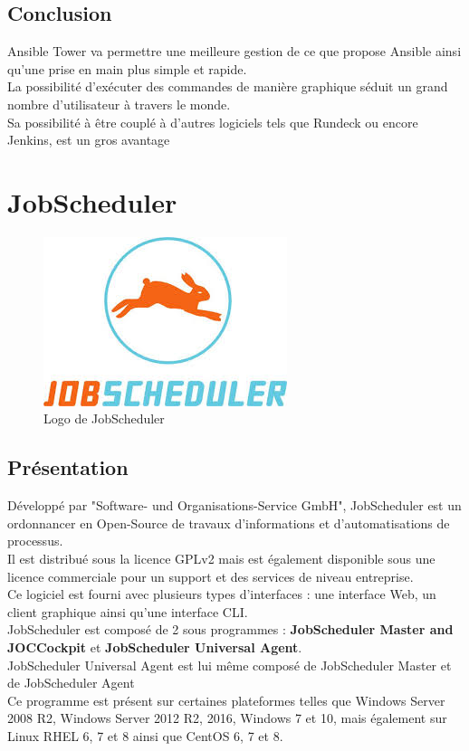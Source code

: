 \documentclass[12pt]{article}
\begin{document}
\subsection{Conclusion}
Ansible Tower va permettre une meilleure gestion de ce que propose Ansible ainsi qu'une prise en main plus simple et rapide.
\\
La possibilité d'exécuter des commandes de manière graphique séduit un grand nombre d'utilisateur à travers le monde.
\\
Sa possibilité à être couplé à d'autres logiciels tels que Rundeck ou encore Jenkins, est un gros avantage

\section{JobScheduler}

\begin{figure}[ht]
    \centering
    \includegraphics[scale=0.6]{images/jobscheduler.jpg}
    \caption{Logo de JobScheduler}
\end{figure}

\subsection{Présentation}
Développé par "Software- und Organisations-Service GmbH", JobScheduler est un ordonnancer en Open-Source de travaux d'informations et d'automatisations de processus.
\\
Il est distribué sous la licence GPLv2 mais est également disponible sous une licence commerciale pour un support et des services de niveau entreprise.
\\
Ce logiciel est fourni avec plusieurs types d'interfaces : une interface Web, un client graphique ainsi qu'une interface CLI.
\\
JobScheduler est composé de 2 sous programmes : \textbf{JobScheduler Master and JOC\footnotemark[1] Cockpit} et \textbf{JobScheduler Universal Agent}.
\\
JobScheduler Universal Agent est lui même composé de JobScheduler Master et de JobScheduler Agent
\\
Ce programme est présent sur certaines plateformes telles que Windows Server 2008 R2, Windows Server 2012 R2, 2016, Windows 7 et 10, mais également sur Linux RHEL  6, 7 et 8 ainsi que CentOS  6, 7 et 8.
\end{document}
